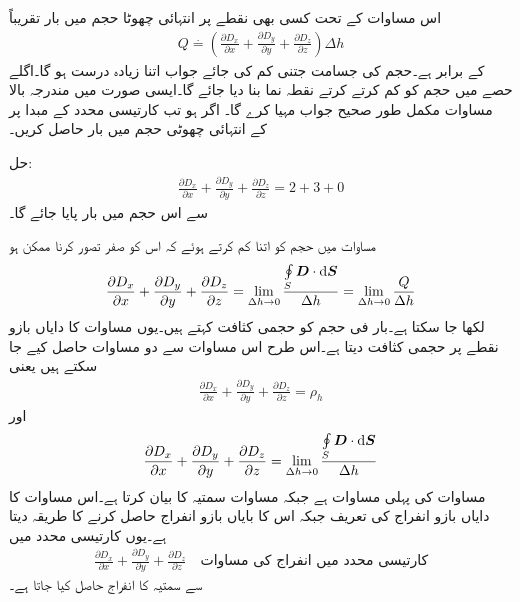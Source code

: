 اس مساوات کے تحت کسی بھی نقطے پر انتہائی چھوٹا حجم  میں بار تقریباً
\begin{align}
Q\overset{.}{=} \left( \frac{\partial D_x}{\partial x}+\frac{\partial D_y}{\partial y}+\frac{\partial D_z}{\partial z} \right)\Delta h
\end{align}
کے برابر ہے۔حجم کی جسامت جتنی کم کی جائے جواب اتنا زیادہ درست ہو گا۔اگلے حصے میں حجم کو کم کرتے کرتے نقطہ نما بنا دیا جائے گا۔ایسی صورت میں مندرجہ بالا مساوات مکمل طور صحیح جواب مہیا کرے گا۔
اگر  ہو تب کارتیسی محدد کے مبدا پر  کے انتہائی چھوٹی حجم میں بار حاصل کریں۔

حل:
\begin{align*}
\frac{\partial D_x}{\partial x}+\frac{\partial D_y}{\partial y}+\frac{\partial D_z}{\partial z} =2+3+0
\end{align*}
سے اس حجم میں  بار  پایا جائے گا۔

مساوات  میں حجم  کو اتنا کم کرتے ہوئے کہ اس کو صفر تصور کرنا ممکن ہو
\begin{align*}
\frac{\partial D_x}{\partial x}+\frac{\partial D_y}{\partial y}+\frac{\partial D_z}{\partial z}=\lim_{\Delta h \to 0}\frac{\oint\limits_{S}\kvec{D}\cdot \dif \kvec{S}}{\Delta h}=\lim_{\Delta h \to 0} \frac{Q}{\Delta h}
\end{align*}
لکھا جا سکتا ہے۔بار فی حجم کو حجمی کثافت کہتے ہیں۔یوں مساوات کا دایاں بازو نقطے پر حجمی کثافت  دیتا ہے۔اس طرح اس مساوات سے دو مساوات حاصل کیے جا سکتے ہیں یعنی
\begin{align}\label{مساوات_گاوس_میکسویل_پھیلاو_مساوات}
\frac{\partial D_x}{\partial x}+\frac{\partial D_y}{\partial y}+\frac{\partial D_z}{\partial z}=\rho_h
\end{align}
اور 
\begin{align}\label{مساوات_گاوس_پھیلاو_کی_تعریف}
\frac{\partial D_x}{\partial x}+\frac{\partial D_y}{\partial y}+\frac{\partial D_z}{\partial z}=\lim_{\Delta h \to 0}\frac{\oint\limits_{S}\kvec{D}\cdot \dif \kvec{S}}{\Delta h}
\end{align}
مساوات   کی پہلی مساوات ہے جبکہ مساوات  سمتیہ  کا  بیان کرتا ہے۔اس مساوات کا دایاں بازو انفراج کی تعریف جبکہ اس کا بایاں بازو انفراج حاصل کرنے کا طریقہ دیتا ہے۔یوں کارتیسی محدد میں 
\begin{align}\label{مساوات_گاوس_کارتیسی_محدد_پھیلاو_کی_مساوات}
\frac{\partial D_x}{\partial x}+\frac{\partial D_y}{\partial y}+\frac{\partial D_z}{\partial z} \quad \text{کارتیسی محدد میں انفراج کی مساوات}
\end{align}
سے سمتیہ  کا انفراج حاصل کیا جاتا ہے۔

